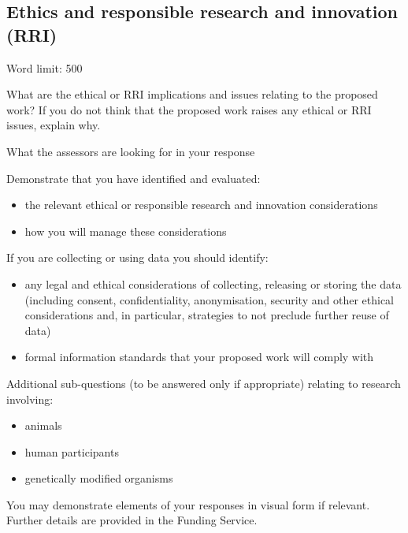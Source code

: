 \documentclass[11pt]{article}
\newenvironment{instruction}{%
    \begin{tcolorbox}[breakable,colback=red!5,colframe=red,title=Instruction]%
	}{%
    	\end{tcolorbox}%
	}
\begin{document}
% 

\pagebreak
\subsection{Ethics and responsible research and innovation (RRI)}

\begin{instruction}

Word limit: 500

What are the ethical or RRI implications and issues relating to the proposed
work? If you do not think that the proposed work raises any ethical or RRI
issues, explain why.

What the assessors are looking for in your response

Demonstrate that you have identified and evaluated:

\begin{itemize}

	\item the relevant ethical or responsible research and innovation considerations

	\item how you will manage these considerations

\end{itemize}

If you are collecting or using data you should identify:

\begin{itemize}

	\item any legal and ethical considerations of collecting, releasing or
storing the data (including consent, confidentiality, anonymisation, security
and other ethical considerations and, in particular, strategies to not preclude
further reuse of data)

	\item formal information standards that your proposed work will comply with

\end{itemize}

Additional sub-questions (to be answered only if appropriate) relating to
research involving:

\begin{itemize}

	\item animals

	\item human participants

	\item genetically modified organisms

\end{itemize}

You may demonstrate elements of your responses in visual form if relevant.
Further details are provided in the Funding Service.

\end{instruction}
\end{document}

